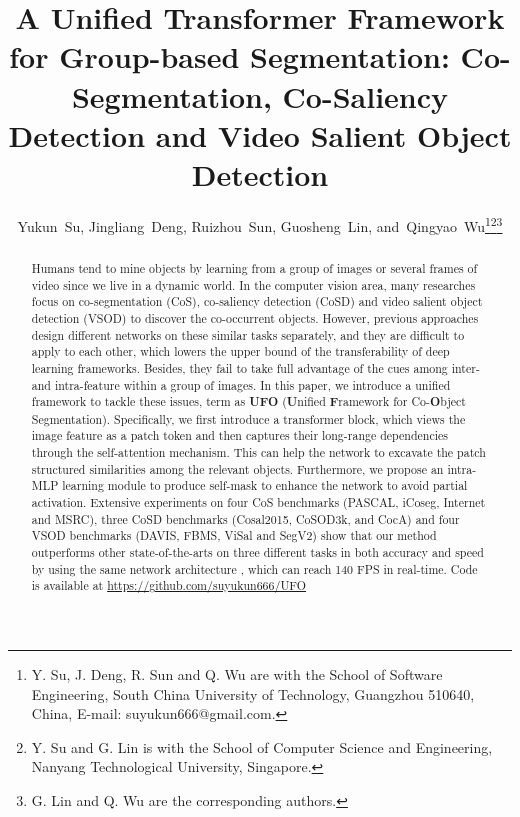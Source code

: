 \documentclass[journal]{IEEEtran}
\begin{document}
\title{A Unified Transformer Framework for Group-based Segmentation: Co-Segmentation, Co-Saliency Detection and Video Salient Object Detection}


\author{Yukun~Su, Jingliang~Deng, Ruizhou~Sun, Guosheng~Lin, 
        and~Qingyao~Wu\thanks{Y. Su, J. Deng, R. Sun and Q. Wu are with the School of Software Engineering, South China University
	of Technology, Guangzhou 510640, China, E-mail: suyukun666@gmail.com.}\thanks{Y. Su and G. Lin is with the School of Computer Science and Engineering, Nanyang Technological University, Singapore.}\thanks{G. Lin and Q. Wu are the corresponding authors.}}






\maketitle

\begin{abstract}
Humans tend to mine objects by learning from a group of images or several frames of video since we live in a dynamic world. In the computer vision area, many researches focus on co-segmentation (CoS), co-saliency detection (CoSD) and video salient object detection (VSOD) to discover the co-occurrent objects.
However, previous approaches design different networks on these similar tasks separately, and they are difficult to apply to each other, which lowers the upper bound of the transferability of deep learning frameworks. Besides, they fail to take full advantage of the cues among inter- and intra-feature within a group of images.
In this paper, we introduce a unified framework to tackle these issues, term as \textbf{UFO} (\textbf{U}nified \textbf{F}ramework for Co-\textbf{O}bject Segmentation).
Specifically, we first introduce a transformer block, which views the image feature as a patch token and then captures their long-range dependencies through the self-attention mechanism. This can help the network to excavate the patch structured similarities among the relevant objects.
Furthermore, we propose an intra-MLP learning module to produce self-mask to enhance the network to avoid partial activation.
Extensive experiments on four CoS benchmarks (PASCAL, iCoseg, Internet and MSRC), three CoSD benchmarks (Cosal2015, CoSOD3k, and CocA) and four VSOD benchmarks (DAVIS, FBMS, ViSal and SegV2) show that our method outperforms other state-of-the-arts on three different tasks in both accuracy and speed by using the same network architecture , which can reach 140 FPS in real-time. Code is available at \url{https://github.com/suyukun666/UFO}

\end{abstract}
\end{document}
